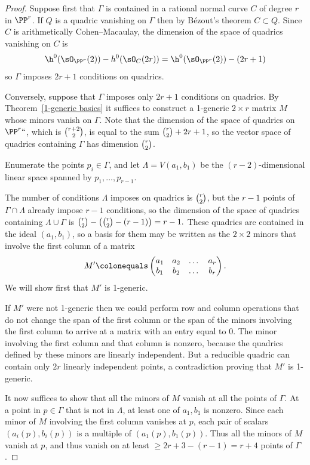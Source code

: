 \begin{proof} Suppose first that $\Gamma$ is contained in a rational
normal curve $C$ of degree $r$ in $\PP^{r}$.
If $Q$ is a quadric vanishing on $\Gamma$ then by B\'ezout's theorem
$C\subset Q$. Since $C$ is arithmetically
Cohen--Macaulay, the dimension of the space of quadrics vanishing on
$C$ is
$$
\h^{0}(\sO_{\PP^{r}}(2)) - h^{0}(\sO_{C}(2r)) = \h^{0}(\sO_{\PP^{r}}(2))
-(2r+1)
$$
so $\Gamma$ imposes $2r+1$ conditions on quadrics.

Conversely, suppose that $\Gamma$ imposes only $2r+1$ conditions on
quadrics.
By Theorem~\ref{1-generic basics} it suffices to construct a 1-generic
$2\times r$ matrix $M$ whose minors vanish on
$\Gamma$. Note that the dimension of the space of quadrics on $\PP^r`
`$, which is $\tbinom{r+2}{2}$, is equal to the sum
$\tbinom{r}{2}+2r+1$, so the vector space of quadrics containing $\Gamma$
has dimension $\tbinom{r}{2}$.

Enumerate the points $p_i\in \Gamma$, and let $\Lambda = V(a_1,b_1)$
be the $(r-2)$-dimensional linear
space spanned by $p_1,\dots,p_{r-1}$.

The number of
conditions $\Lambda$ imposes on quadrics is $\tbinom{r}{2}$, but the $r-1$
points of $\Gamma \cap \Lambda$
already impose $r-1$ conditions, so the dimension of the space of quadrics
containing $\Lambda\cup \Gamma$
is $\tbinom{r}{2}-\bigl(\tbinom{r}{2}-(r-1)\bigr) = r-1.$ These quadrics
are contained in the ideal $(a_1,b_1)$, so a
basis for them
may be written as the $2\times 2$ minors that involve the first column
of a matrix
$$
M' \colonequals  \begin{pmatrix}
a_1&a_2&\dots&a_{r}\\
b_1&b_2&\dots&b_{r}
\end{pmatrix}.
$$
We will show first that $M'$ is 1-generic.

If $M'$ were not 1-generic then we could perform row and column operations
that do not change the
span of the first column or the span of the minors involving the first
column
to arrive at a matrix with an entry equal to 0. The minor
involving the first column and that column is nonzero, because the
quadrics defined by
these minors are linearly independent. But a reducible quadric can contain
only $2r$ linearly independent points, a contradiction proving that $M'$
is 1-generic.

It now suffices to show that all the minors of $M$ vanish at all the
points of $\Gamma$.
At a point in $p\in \Gamma$ that is not in $\Lambda$, at least one of
$a_1,b_1$ is nonzero.
Since each minor
of $M$ involving the first column vanishes at $p$, each pair
of scalars $(a_i(p),b_i(p))$ is a multiple of $(a_1(p), b_1(p))$. Thus
all the minors
of $M$ vanish at $p$, and thus vanish on at least $\geq 2r+3-(r-1) =
r+4$ points of $\Gamma$.


\end{proof}
